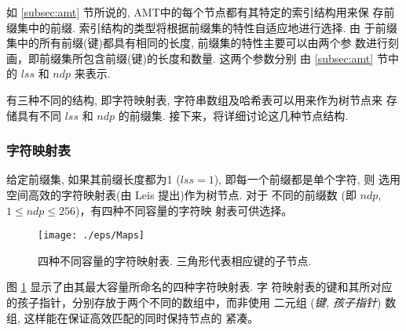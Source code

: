 \documentclass{ws-ijprai}
\begin{document}
如 \ref{subsec:amt} 节所说的, AMT中的每个节点都有其特定的索引结构用来保
存前缀集中的前缀. 索引结构的类型将根据前缀集的特性自适应地进行选择. 由
于前缀集中的所有前缀(键)都具有相同的长度, 前缀集的特性主要可以由两个参
数进行刻画，即前缀集所包含前缀(键)的长度和数量. 这两个参数分别
由 \ref{subsec:amt} 节中的 $lss$ 和 $ndp$ 来表示.

有三种不同的结构, 即字符映射表, 字符串数组及哈希表可以用来作为树节点来
存储具有不同 $lss$ 和 $ndp$ 的前缀集. 接下来，将详细讨论这几种节点结构.

\subsubsection{字符映射表}

给定前缀集, 如果其前缀长度都为1 ($lss=1$), 即每一个前缀都是单个字符, 则
选用空间高效的字符映射表(由 Leis \cite{Leis2013} 提出)作为树节点. 对于
不同的前缀数 (即 $ndp$, $1 \leq ndp \leq 256$)，有四种不同容量的字符映
射表可供选择。

\begin{figure}[hp]
  \centering
  \texttt{[image: ./eps/Maps]}
  \caption{四种不同容量的字符映射表. 三角形代表相应键的子节点.}
  \label{fig:character map}
\end{figure}

图 \ref{fig:character map} 显示了由其最大容量所命名的四种字符映射表. 字
符映射表的键和其所对应的孩子指针，分别存放于两个不同的数组中，而非使用
二元组 (\emph{键, 孩子指针}) 数组, 这样能在保证高效匹配的同时保持节点的
紧凑。
\end{document}
